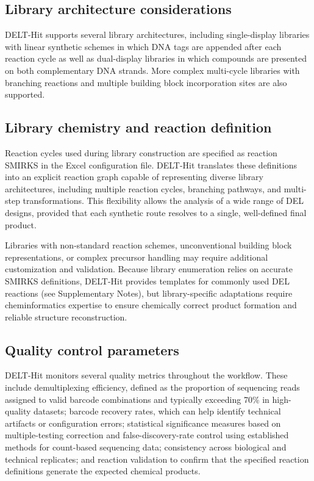\documentclass[pdflatex,sn-nature]{sn-jnl}
\begin{document}
\subsection{Library architecture considerations}
DELT-Hit supports several library architectures, including single-display libraries with linear synthetic schemes in which DNA tags are appended after each reaction cycle as well as dual-display libraries in which compounds are presented on both complementary DNA strands. More complex multi-cycle libraries with branching reactions and multiple building block incorporation sites are also supported.


\subsection{Library chemistry and reaction definition}
Reaction cycles used during library construction are specified as reaction SMIRKS in the Excel configuration file. DELT-Hit translates these definitions into an explicit reaction graph capable of representing diverse library architectures, including multiple reaction cycles, branching pathways, and multi-step transformations. This flexibility allows the analysis of a wide range of DEL designs, provided that each synthetic route resolves to a single, well-defined final product.

Libraries with non-standard reaction schemes, unconventional building block representations, or complex precursor handling may require additional customization and validation. Because library enumeration relies on accurate SMIRKS definitions, DELT-Hit provides templates for commonly used DEL reactions (see Supplementary Notes), but library-specific adaptations require cheminformatics expertise to ensure chemically correct product formation and reliable structure reconstruction. 


\subsection{Quality control parameters}
DELT-Hit monitors several quality metrics throughout the workflow. These include demultiplexing efficiency, defined as the proportion of sequencing reads assigned to valid barcode combinations and typically exceeding 70\% in high-quality datasets; barcode recovery rates, which can help identify technical artifacts or configuration errors; statistical significance measures based on multiple-testing correction and false-discovery-rate control using established methods for count-based sequencing data; consistency across biological and technical replicates; and reaction validation to confirm that the specified reaction definitions generate the expected chemical products.
\end{document}
